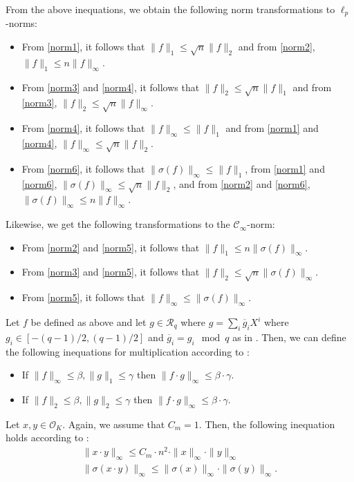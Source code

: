 \documentclass[
  a4paper,  %
  twoside,  %
  bibliography=totoc,
  headsepline,
  cleardoublepage=empty,
  parskip=half,
  draft=false
]{scrbook}
\begin{document}
From the above inequations, we obtain the following norm transformations to $\ell_p$-norms:
\begin{itemize}
  \item From \cref{norm1}, it follows that $\| f \|_1 \leq \sqrt{n} \| f \|_2$ and from \cref{norm2}, $\| f \|_1 \leq n \| f \|_\infty$.
  \item From \cref{norm3} and \cref{norm4}, it follows that $\| f \|_2 \leq \sqrt{n}  \| f \|_1$ and from \cref{norm3}, $\| f \|_2 \leq \sqrt{n}  \| f \|_\infty$.
  \item From \cref{norm4}, it follows that $\| f \|_\infty \leq  \| f \|_1$ and from \cref{norm1} and \cref{norm4}, $\| f \|_\infty \leq \sqrt{n}  \| f \|_2$.
  \item From \cref{norm6}, it follows that $\| \sigma(f) \|_\infty \leq  \| f \|_1$, from \cref{norm1} and \cref{norm6}, $\| \sigma(f) \|_\infty \leq \sqrt{n}  \| f \|_2$, and from \cref{norm2} and \cref{norm6}, $\| \sigma(f) \|_\infty \leq n  \| f \|_\infty$.
\end{itemize}

Likewise, we get the following transformations to the $\mathcal{C}_\infty$-norm:
\begin{itemize}
  \item From \cref{norm2} and \cref{norm5}, it follows that $\| f \|_1 \leq  n \| \sigma(f) \|_\infty$.
  \item From \cref{norm3} and \cref{norm5}, it follows that $\| f \|_2 \leq  \sqrt{n} \| \sigma(f) \|_\infty$.
  \item From \cref{norm5}, it follows that $\| f \|_\infty \leq  \| \sigma(f) \|_\infty$.
\end{itemize}

Let $f$ be defined as above and let $g \in \mathcal{R}_q$ where $g = \sum_i \overline{g}_i X^i$ where $g_i \in \left[-(q-1)/2, (q-1)/2\right]$ and $\overline{g}_i = g_i \mod q$ as in \cite{BDLOP18}. Then, we can define the following inequations for multiplication according to \cite{BDLOP18}:

\begin{itemize}
  \item If $\|f\|_\infty \leq \beta, \|g\|_1 \leq \gamma$ then $\|f \cdot g\|_\infty \leq \beta \cdot \gamma$.
  \item If $\|f\|_2 \leq \beta, \|g\|_2 \leq \gamma$ then $\|f \cdot g\|_\infty \leq \beta \cdot \gamma$.
\end{itemize}

Let $x, y \in \mathcal{O}_K$. Again, we assume that $C_m = 1$. Then, the following inequation holds according to \cite{DPSZ12}:
\begin{align}
  \| x \cdot y \|_\infty \leq C_m \cdot n^2 \cdot \| x \|_\infty \cdot \| y \|_\infty\\
  \| \sigma(x \cdot y) \|_\infty \leq  \| \sigma(x) \|_\infty \cdot \| \sigma(y) \|_\infty.
\end{align}
\end{document}
